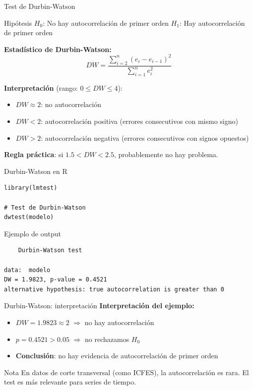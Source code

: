 \documentclass[aspectratio=169, 11pt]{beamer}
\begin{document}
\begin{frame}{Test de Durbin-Watson}
\begin{block}{Hipótesis}
$H_0$: No hay autocorrelación de primer orden \qquad $H_1$: Hay autocorrelación de primer orden
\end{block}

\textbf{Estadístico de Durbin-Watson:}
$$DW = \frac{\sum_{i=2}^{n}(e_i - e_{i-1})^2}{\sum_{i=1}^{n}e_i^2}$$

\vspace{0.15cm}
\textbf{Interpretación} (rango: $0 \leq DW \leq 4$):
\begin{itemize}
\item $DW \approx 2$: no autocorrelación
\item $DW < 2$: autocorrelación positiva (errores consecutivos con mismo signo)
\item $DW > 2$: autocorrelación negativa (errores consecutivos con signos opuestos)
\end{itemize}

\vspace{0.1cm}
\small
\textbf{Regla práctica}: si $1.5 < DW < 2.5$, probablemente no hay problema.
\end{frame}

\begin{frame}[fragile]{Durbin-Watson en R}
\begin{lstlisting}
library(lmtest)

# Test de Durbin-Watson
dwtest(modelo)
\end{lstlisting}

\vspace{0.2cm}
\begin{exampleblock}{Ejemplo de output}
\small
\begin{verbatim}
    Durbin-Watson test

data:  modelo
DW = 1.9823, p-value = 0.4521
alternative hypothesis: true autocorrelation is greater than 0
\end{verbatim}
\end{exampleblock}
\end{frame}

\begin{frame}{Durbin-Watson: interpretación}
\textbf{Interpretación del ejemplo:}
\begin{itemize}
\item $DW = 1.9823 \approx 2$ $\Rightarrow$ no hay autocorrelación
\item $p = 0.4521 > 0.05$ $\Rightarrow$ no rechazamos $H_0$
\item \textbf{Conclusión}: no hay evidencia de autocorrelación de primer orden
\end{itemize}

\vspace{0.3cm}
\begin{alertblock}{Nota}
En datos de corte transversal (como ICFES), la autocorrelación es rara. El test es más relevante para series de tiempo.
\end{alertblock}
\end{frame}
\end{document}
